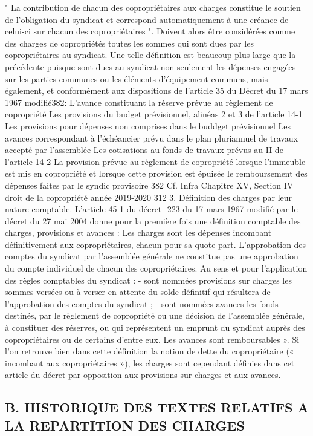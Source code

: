 		" La contribution de chacun des copropriétaires aux charges constitue le soutien de l'obligation du syndicat et correspond automatiquement à une créance de celui-ci sur chacun des copropriétaires ".
		Doivent alors être considérées comme des charges de copropriétés toutes les sommes qui sont dues par les copropriétaires au syndicat.
		Une telle définition est beaucoup plus large que la précédente puisque sont dues au syndicat non seulement les dépenses engagées sur les parties communes ou les éléments d'équipement communs, mais également, et conformément aux dispositions de l'article 35 du Décret du 17 mars 1967 modifié382:
		L'avance constituant la réserve prévue au règlement de copropriété
		Les provisions du budget prévisionnel, alinéas 2 et 3 de l’article 14-1
		Les provisions pour dépenses non comprises dans le buddget prévisionnel
		Les avances correspondant à l’échéancier prévu dans le plan pluriannuel de travaux accepté par l’assemblée
		Les cotisations au fonds de travaux prévus au II de l’article 14-2
		La provision prévue au règlement de copropriété lorsque l’immeuble est mis en copropriété et lorsque cette provision est épuisée le remboursement des dépenses faites par le syndic provisoire
		382 Cf. Infra Chapitre XV, Section IV
		droit de la copropriété année 2019-2020
		312
		3. Définition des charges par leur nature comptable.
		L’article 45-1 du décret -223 du 17 mars 1967 modifié par le décret du 27 mai 2004 donne pour la première fois une définition comptable des charges, provisions et avances :
		Les charges sont les dépenses incombant définitivement aux copropriétaires, chacun pour sa quote-part. L'approbation des comptes du syndicat par l'assemblée générale ne constitue pas une approbation du compte individuel de chacun des copropriétaires.
		Au sens et pour l'application des règles comptables du syndicat :
		- sont nommées provisions sur charges les sommes versées ou à verser en attente du solde définitif qui résultera de l'approbation des comptes du syndicat ;
		- sont nommées avances les fonds destinés, par le règlement de copropriété ou une décision de l'assemblée générale, à constituer des réserves, ou qui représentent un emprunt du syndicat auprès des copropriétaires ou de certains d'entre eux. Les avances sont remboursables ».
		Si l’on retrouve bien dans cette définition la notion de dette du copropriétaire (« incombant aux copropriétaires »), les charges sont cependant définies dans cet article du décret par opposition aux provisions sur charges et aux avances.
	
	\subsection{B. HISTORIQUE DES TEXTES RELATIFS A LA REPARTITION DES CHARGES}
	
